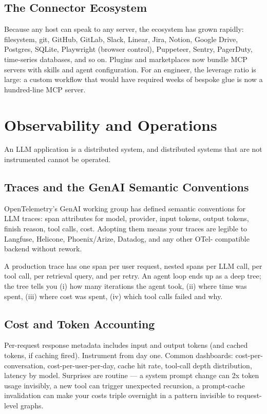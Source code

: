 \subsection{The Connector Ecosystem}

Because any host can speak to any server, the ecosystem has
grown rapidly: filesystem, git, GitHub, GitLab, Slack, Linear,
Jira, Notion, Google Drive, Postgres, SQLite, Playwright (browser
control), Puppeteer, Sentry, PagerDuty, time-series databases,
and so on. Plugins and marketplaces now bundle MCP servers with
skills and agent configuration. For an engineer, the leverage
ratio is large: a custom workflow that would have required weeks
of bespoke glue is now a hundred-line MCP server.

\section{Observability and Operations}

An LLM application is a distributed system, and distributed
systems that are not instrumented cannot be operated.

\subsection{Traces and the GenAI Semantic Conventions}

OpenTelemetry's GenAI working group has defined semantic
conventions \citep{otel_genai} for LLM traces: span attributes
for model, provider, input tokens, output tokens, finish reason,
tool calls, cost. Adopting them means your traces are legible to
Langfuse, Helicone, Phoenix/Arize, Datadog, and any other OTel-
compatible backend without rework.

A production trace has one span per user request, nested spans
per LLM call, per tool call, per retrieval query, and per retry.
An agent loop ends up as a deep tree; the tree tells you (i) how
many iterations the agent took, (ii) where time was spent, (iii)
where cost was spent, (iv) which tool calls failed and why.

\subsection{Cost and Token Accounting}

Per-request response metadata includes input and output tokens
(and cached tokens, if caching fired). Instrument from day one.
Common dashboards: cost-per-conversation, cost-per-user-per-day,
cache hit rate, tool-call depth distribution, latency by model.
Surprises are routine --- a system prompt change can 2x token
usage invisibly, a new tool can trigger unexpected recursion,
a prompt-cache invalidation can make your costs triple overnight
in a pattern invisible to request-level graphs.

